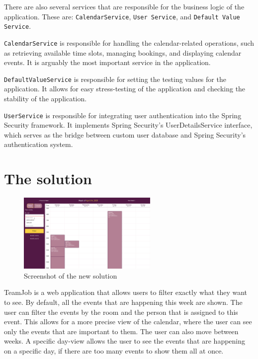 There are also several services that are responsible for the business logic of the application.
These are: \texttt{CalendarService}, \texttt{User Service}, and \texttt{Default Value Service}.


\texttt{CalendarService} is responsible for handling the calendar-related operations, such as retrieving available time slots, managing bookings, and displaying calendar events.
It is arguably the most important service in the application.


\texttt{DefaultValueService} is responsible for setting the testing values for the application.
It allows for easy stress-testing of the application and checking the stability of the application.

\texttt{UserService} is responsible for integrating user authentication into the Spring Security framework.
It implements Spring Security's UserDetailsService interface, which serves as the bridge between custom user database and Spring Security's authentication system.


\section{The solution}\label{sec:the-solution}
\begin{figure}[h]
    \centering
    \includegraphics[width=0.6\textwidth]{TeamJob}
    \caption{Screenshot of the new solution}
    \label{fig:TeamJob}
\end{figure}
TeamJob is a web application that allows users to filter exactly what they want to see.
By default, all the events that are happening this week are shown.
The user can filter the events by the room and the person that is assigned to this event.
This allows for a more precise view of the calendar, where the user can see only the events that are important to them.
The user can also move between weeks.
A specific day-view allows the user to see the events that are happening on a specific day, if there are too many events to show them all at once.
